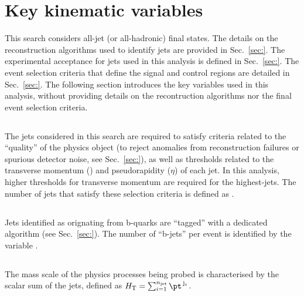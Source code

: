 \section{Key kinematic variables}

This search considers all-jet (or all-hadronic) final states. The
details on the reconstruction algorithms used to identify jets are
provided in Sec.~\ref{sec:}. The experimental acceptance for jets used
in this analysis is defined in Sec.~\ref{sec:}. The event selection
criteria that define the signal and control regions are detailed in
Sec.~\ref{sec:}. The following section introduces the key variables
used in this analysis, without providing details on the recontruction
algorithms nor the final event selection criteria.

\subsection{\texorpdfstring{\njet}{Njet}}

The jets considered in this search are required to satisfy criteria
related to the ``quality'' of the physics object (to reject anomalies
from \eg reconstruction failures or spurious detector noise, see
Sec.~\ref{sec:}), as well as thresholds related to the transverse
momentum (\Pt) and pseudorapidity ($\eta$) of each jet. In this
analysis, higher thresholds for transverse momentum are required for
the highest-\Pt jets. The number of jets that satisfy these selection
criteria is defined as \njet.

\subsection{\texorpdfstring{\nb}{Nb}}

Jets identified as orignating from b-quarks are ``tagged'' with a
dedicated algorithm (see Sec.~\ref{sec:}). The number of ``b-jets''
per event is identified by the variable \nb.

\subsection{\texorpdfstring{\scalht}{HT}}

The mass scale of the physics processes being probed is characterised
by the scalar \pt sum of the jets, defined as $\scalht =
\sum_{i=1}^{\njet} \pt^{\,\mathrm{j}_i}$.

\subsection{\texorpdfstring{\HTmiss}{HTmiss}}

